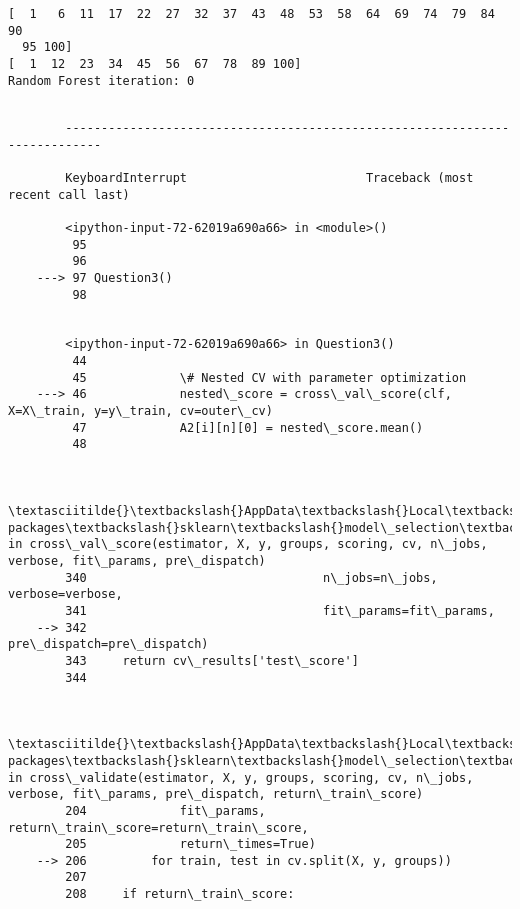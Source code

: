 \documentclass[11pt]{article}
\begin{document}
    \begin{Verbatim}[commandchars=\\\{\}]
[  1   6  11  17  22  27  32  37  43  48  53  58  64  69  74  79  84  90
  95 100]
[  1  12  23  34  45  56  67  78  89 100]
Random Forest iteration: 0 

    \end{Verbatim}

    \begin{Verbatim}[commandchars=\\\{\}]

        ---------------------------------------------------------------------------

        KeyboardInterrupt                         Traceback (most recent call last)

        <ipython-input-72-62019a690a66> in <module>()
         95 
         96 
    ---> 97 Question3()
         98 
    

        <ipython-input-72-62019a690a66> in Question3()
         44 
         45             \# Nested CV with parameter optimization
    ---> 46             nested\_score = cross\_val\_score(clf, X=X\_train, y=y\_train, cv=outer\_cv)
         47             A2[i][n][0] = nested\_score.mean()
         48 
    

        \textasciitilde{}\textbackslash{}AppData\textbackslash{}Local\textbackslash{}Continuum\textbackslash{}anaconda3\textbackslash{}lib\textbackslash{}site-packages\textbackslash{}sklearn\textbackslash{}model\_selection\textbackslash{}\_validation.py in cross\_val\_score(estimator, X, y, groups, scoring, cv, n\_jobs, verbose, fit\_params, pre\_dispatch)
        340                                 n\_jobs=n\_jobs, verbose=verbose,
        341                                 fit\_params=fit\_params,
    --> 342                                 pre\_dispatch=pre\_dispatch)
        343     return cv\_results['test\_score']
        344 
    

        \textasciitilde{}\textbackslash{}AppData\textbackslash{}Local\textbackslash{}Continuum\textbackslash{}anaconda3\textbackslash{}lib\textbackslash{}site-packages\textbackslash{}sklearn\textbackslash{}model\_selection\textbackslash{}\_validation.py in cross\_validate(estimator, X, y, groups, scoring, cv, n\_jobs, verbose, fit\_params, pre\_dispatch, return\_train\_score)
        204             fit\_params, return\_train\_score=return\_train\_score,
        205             return\_times=True)
    --> 206         for train, test in cv.split(X, y, groups))
        207 
        208     if return\_train\_score:
    


\end{Verbatim}
\end{document}
